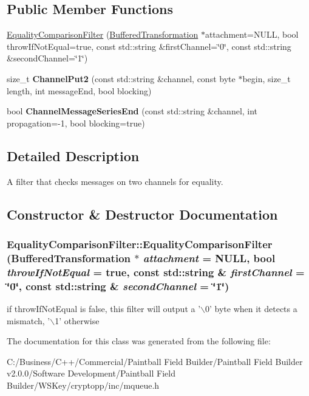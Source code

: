 \subsection*{Public Member Functions}
\begin{DoxyCompactItemize}
\item 
\hyperlink{class_equality_comparison_filter_a488c095db121999ba40c936573701d10}{EqualityComparisonFilter} (\hyperlink{class_buffered_transformation}{BufferedTransformation} $\ast$attachment=NULL, bool throwIfNotEqual=true, const std::string \&firstChannel=\char`\"{}0\char`\"{}, const std::string \&secondChannel=\char`\"{}1\char`\"{})
\item 
\hypertarget{class_equality_comparison_filter_af6f119a0a2e8a91c46676fc4f1eeeddc}{
size\_\-t {\bfseries ChannelPut2} (const std::string \&channel, const byte $\ast$begin, size\_\-t length, int messageEnd, bool blocking)}
\label{class_equality_comparison_filter_af6f119a0a2e8a91c46676fc4f1eeeddc}

\item 
\hypertarget{class_equality_comparison_filter_a97d5eb6fd119c9bdbee7d08b98450667}{
bool {\bfseries ChannelMessageSeriesEnd} (const std::string \&channel, int propagation=-\/1, bool blocking=true)}
\label{class_equality_comparison_filter_a97d5eb6fd119c9bdbee7d08b98450667}

\end{DoxyCompactItemize}


\subsection{Detailed Description}
A filter that checks messages on two channels for equality. 

\subsection{Constructor \& Destructor Documentation}
\hypertarget{class_equality_comparison_filter_a488c095db121999ba40c936573701d10}{
\subsubsection[{EqualityComparisonFilter}]{\setlength{\rightskip}{0pt plus 5cm}EqualityComparisonFilter::EqualityComparisonFilter ({\bf BufferedTransformation} $\ast$ {\em attachment} = {\ttfamily NULL}, \/  bool {\em throwIfNotEqual} = {\ttfamily true}, \/  const std::string \& {\em firstChannel} = {\ttfamily \char`\"{}0\char`\"{}}, \/  const std::string \& {\em secondChannel} = {\ttfamily \char`\"{}1\char`\"{}})}}
\label{class_equality_comparison_filter_a488c095db121999ba40c936573701d10}
if throwIfNotEqual is false, this filter will output a '$\backslash$0' byte when it detects a mismatch, '$\backslash$1' otherwise 

The documentation for this class was generated from the following file:\begin{DoxyCompactItemize}
\item 
C:/Business/C++/Commercial/Paintball Field Builder/Paintball Field Builder v2.0.0/Software Development/Paintball Field Builder/WSKey/cryptopp/inc/mqueue.h\end{DoxyCompactItemize}
